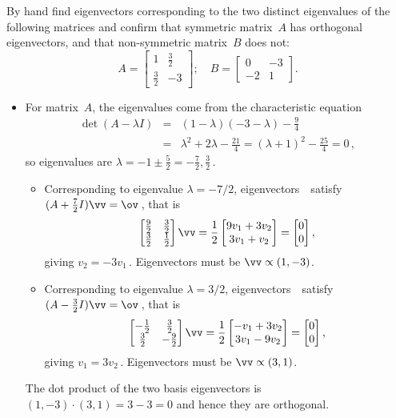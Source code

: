 \begin{example} \label{eg:2x2orthevec}
By hand find eigenvectors corresponding to the two distinct eigenvalues of the following matrices and confirm that symmetric matrix~\(A\) has orthogonal eigenvectors, and that non-symmetric matrix~\(B\) does not:
\begin{equation*}
A=\begin{bmatrix} 1&\frac32\\\frac32&-3 \end{bmatrix};\quad
B=\begin{bmatrix} 0&-3\\-2&1 \end{bmatrix}.
\end{equation*}

\begin{solution} 
\begin{itemize}
\item For matrix~\(A\), the eigenvalues come from the characteristic equation
\begin{eqnarray*}
\det(A-\lambda I)&=&(1-\lambda)(-3-\lambda)-\tfrac94
\\&=&\lambda^2+2\lambda-\tfrac{21}4
=(\lambda+1)^2-\tfrac{25}4=0\,,
\end{eqnarray*}
so eigenvalues are \(\lambda=-1\pm\tfrac52=-\tfrac72,\tfrac32\)\,.
\begin{itemize}
\item Corresponding to eigenvalue \(\lambda=-7/2\), eigenvectors~\vv\ satisfy \((A+\tfrac72I)\vv=\ov\)\,, that is
\begin{equation*}
\begin{bmatrix} \frac92&\frac32\\\frac32&\frac12 \end{bmatrix}\vv
=\frac12\begin{bmatrix} 9v_1+3v_2\\3v_1+v_2 \end{bmatrix}
=\begin{bmatrix} 0\\0 \end{bmatrix},
\end{equation*}
giving \(v_2=-3v_1\)\,.  Eigenvectors must be \(\vv\propto(1,-3)\).
\item Corresponding to eigenvalue \(\lambda=3/2\), eigenvectors~\vv\ satisfy \((A-\tfrac32I)\vv=\ov\)\,, that is
\begin{equation*}
\begin{bmatrix} -\frac12&\frac32\\\frac32&-\frac92 \end{bmatrix}\vv
=\frac12\begin{bmatrix} -v_1+3v_2\\3v_1-9v_2 \end{bmatrix}
=\begin{bmatrix} 0\\0 \end{bmatrix},
\end{equation*}
giving \(v_1=3v_2\)\,.  Eigenvectors must be \(\vv\propto(3,1)\).
\end{itemize}
The dot product of the two basis eigenvectors is \((1,-3)\cdot(3,1)=3-3=0\) and hence they are orthogonal.


\end{itemize}
\end{solution}
\end{example}
